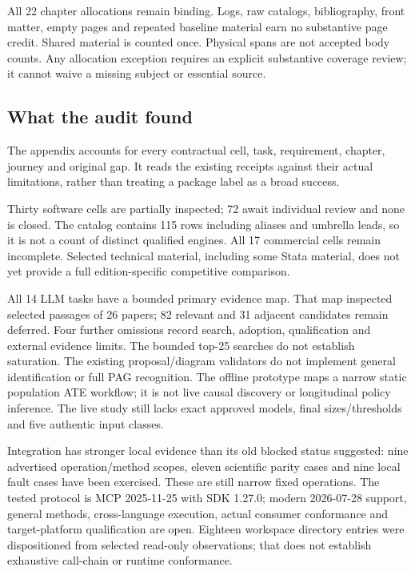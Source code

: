 \documentclass[
  10pt,
]{article}
\begin{document}
All 22 chapter allocations remain binding. Logs, raw catalogs,
bibliography, front matter, empty pages and repeated baseline material
earn no substantive page credit. Shared material is counted once.
Physical spans are not accepted body counts. Any allocation exception
requires an explicit substantive coverage review; it cannot waive a
missing subject or essential source.

\hypertarget{what-the-audit-found}{%
\subsection{What the audit found}\label{what-the-audit-found}}

The appendix accounts for every contractual cell, task, requirement,
chapter, journey and original gap. It reads the existing receipts
against their actual limitations, rather than treating a package label
as a broad success.

Thirty software cells are partially inspected; 72 await individual
review and none is closed. The catalog contains 115 rows including
aliases and umbrella leads, so it is not a count of distinct qualified
engines. All 17 commercial cells remain incomplete. Selected technical
material, including some Stata material, does not yet provide a full
edition-specific competitive comparison.

All 14 LLM tasks have a bounded primary evidence map. That map inspected
selected passages of 26 papers; 82 relevant and 31 adjacent candidates
remain deferred. Four further omissions record search, adoption,
qualification and external evidence limits. The bounded top-25 searches
do not establish saturation. The existing proposal/diagram validators do
not implement general identification or full PAG recognition. The
offline prototype maps a narrow static population ATE workflow; it is
not live causal discovery or longitudinal policy inference. The live
study still lacks exact approved models, final sizes/thresholds and five
authentic input classes.

Integration has stronger local evidence than its old blocked status
suggested: nine advertised operation/method scopes, eleven scientific
parity cases and nine local fault cases have been exercised. These are
still narrow fixed operations. The tested protocol is MCP 2025-11-25
with SDK 1.27.0; modern 2026-07-28 support, general methods,
cross-language execution, actual consumer conformance and
target-platform qualification are open. Eighteen workspace directory
entries were dispositioned from selected read-only observations; that
does not establish exhaustive call-chain or runtime conformance.
\end{document}
